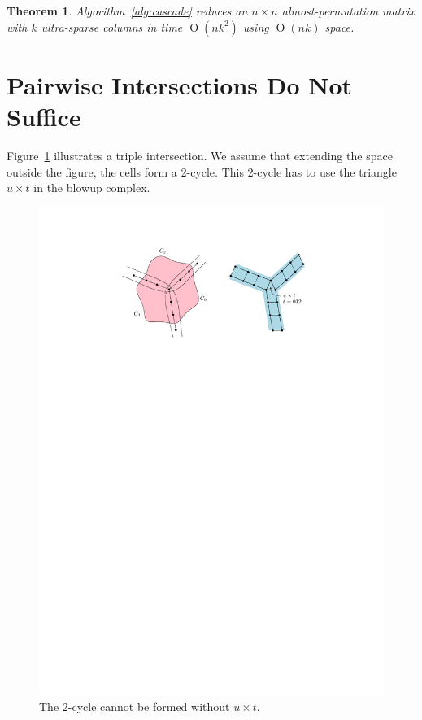 \documentclass{article}
\newcommand{\bigO}  {\operatorname{O}}
\newtheorem{theorem}            {Theorem}
\begin{document}
\begin{theorem}
    \label{thm:cascade-analysis}
    Algorithm~\ref{alg:cascade} reduces an $n \times n$ almost-permutation
    matrix with $k$ ultra-sparse columns in time $\bigO(nk^2)$ using $\bigO(nk)$
    space.
\end{theorem}


\section{Pairwise Intersections Do Not Suffice}

Figure~\ref{fig:triple-intersection} illustrates a triple intersection. We
assume that extending the space outside the figure, the cells form a 2-cycle.
This 2-cycle has to use the triangle $u \times t$ in the blowup complex.

\begin{figure}
    \centering
    \includegraphics{figs/triple-intersection}
    \caption{The 2-cycle cannot be formed without $u \times t$.}
    \label{fig:triple-intersection}
\end{figure}
\end{document}
